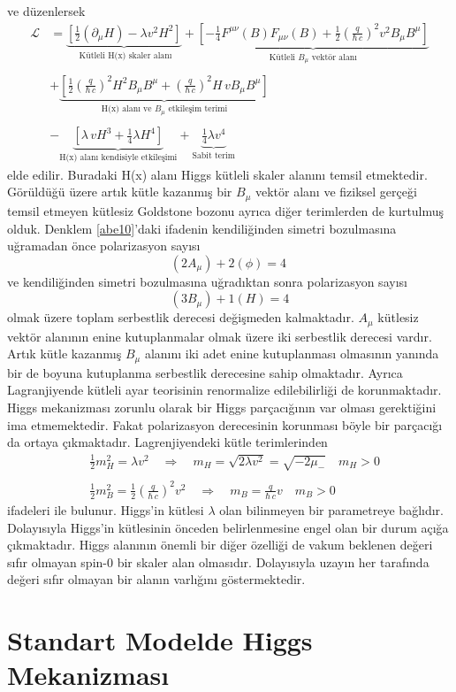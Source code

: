 ve düzenlersek
\begin{equation} \label{abe10}
\begin{aligned}
\mathcal{L} &= \underbrace{ \left[ \frac{1}{2} \left( \partial_{\mu} H \right) - \lambda v^2 H^2 \right] }_{\textrm{ Kütleli H(x) skaler alanı}} +
 \underbrace{ \left[ - \frac{1}{4} F^{\mu \nu}(B) F_{\mu \nu}(B) +  \frac{1}{2} \left( \frac{q}{\hbar \,c} \right)^{2} v^2 B_{\mu} B^{\mu} \right] }_{ \textrm{Kütleli } B_{\mu} \textrm{ vektör alanı} } \\
\\
& + \underbrace{ \left[ \frac{1}{2} \left( \frac{q}{\hbar \,c} \right)^{2} H^2 B_{\mu} B^{\mu} + \left( \frac{q}{\hbar \,c} \right)^{2} H\, v B_{\mu} B^{\mu} \right] }_{ \textrm{H(x) alanı ve } B_{\mu} \textrm{ etkileşim terimi}} \\
\\
& - \underbrace{\left[ \lambda \, v  H^{3} + \frac{1}{4} \lambda H^{4} \right]}_{\textrm{H(x) alanı kendisiyle etkileşimi}} + \underbrace{\frac{1}{4} \lambda v^4}_{\textrm{Sabit terim}}
\end{aligned}
\end{equation} 
elde edilir. Buradaki H(x) alanı Higgs kütleli skaler alanını temsil etmektedir. Görüldüğü üzere artık kütle kazanmış bir $B_{\mu}$ vektör alanı ve fiziksel gerçeği temsil etmeyen kütlesiz Goldstone bozonu ayrıca diğer terimlerden de kurtulmuş olduk. Denklem \eqref{abe10}'daki ifadenin kendiliğinden simetri bozulmasına uğramadan önce polarizasyon sayısı
$$
\left(2 A_{\mu}\right) + 2 \left( \phi \right) = 4 \
$$
ve kendiliğinden simetri bozulmasına uğradıktan sonra polarizasyon sayısı
$$
\left(3 B_{\mu}\right) + 1 \left( H \right) = 4
$$
olmak üzere toplam serbestlik derecesi değişmeden kalmaktadır. $A_{\mu}$ kütlesiz vektör alanının enine kutuplanmalar olmak üzere iki serbestlik derecesi vardır. Artık kütle kazanmış $B_{\mu}$ alanını iki adet enine kutuplanması olmasının yanında bir de boyuna kutuplanma serbestlik derecesine sahip olmaktadır. Ayrıca Lagranjiyende kütleli ayar teorisinin renormalize edilebilirliği de korunmaktadır. Higgs mekanizması zorunlu olarak bir Higgs parçacığının var olması gerektiğini ima etmemektedir. Fakat polarizasyon derecesinin korunması böyle bir parçacığı da ortaya çıkmaktadır. Lagrenjiyendeki kütle terimlerinden
\begin{equation} \label{abe11}
\begin{aligned} 
&\frac{1}{2} m_{H}^{2} = \lambda v^2 \quad \Rightarrow \quad m_{H} = \sqrt{2 \lambda v^2} = \sqrt{- 2 \mu_{-}} \quad m_{H} > 0 \\
\\
& \frac{1}{2} m_{B}^{2} = \frac{1}{2} \left( \frac{q}{\hbar \,c} \right)^{2} v^2 \quad \Rightarrow \quad m_{B} = \frac{q}{\hbar \,c} v \quad m_{B} > 0
\end{aligned}
\end{equation}
ifadeleri ile  bulunur. Higgs'in kütlesi $\lambda$ olan bilinmeyen bir parametreye bağlıdır. Dolayısıyla Higgs'in kütlesinin önceden belirlenmesine engel olan bir durum açığa çıkmaktadır. Higgs alanının önemli bir diğer özelliği de vakum beklenen değeri sıfır olmayan spin-0 bir skaler alan olmasıdır. Dolayısıyla uzayın her tarafında değeri sıfır olmayan bir alanın varlığını göstermektedir.

\section{Standart Modelde Higgs Mekanizması}

